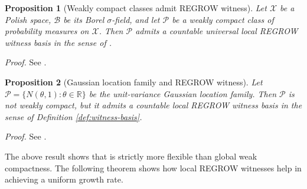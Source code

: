 \documentclass[12pt]{article}
\theoremstyle{spaced}
\newtheorem{proposition}[proposition]{Proposition}
\theoremstyle{remark}
\begin{document}
\begin{proposition}[Weakly compact classes admit REGROW witness]
\label{lem:compact-witness-basis}
Let $\mathcal{X}$ be a Polish space, $ \mathcal{B}$ be its Borel $\sigma$-field, and let $\mathcal{P}$ be a weakly compact class of probability measures on $\mathcal{X}$. Then $\mathcal P$ admits a countable
universal local REGROW witness basis in the sense of
.
\end{proposition}
\emph{Proof.} See .


\begin{proposition}[Gaussian location family and REGROW witness]
\label{prop:gaussian-local-witness}
Let $\mathcal{P} = \{N(\theta, 1) : \theta \in \mathbb{R}\}$ be the unit-variance Gaussian location family. Then $\mathcal{P}$ is not weakly compact, but it admits a countable local REGROW witness basis in the sense of Definition \ref{def:witness-basis}.
\end{proposition}

\emph{Proof.} See .

The above result shows that  is strictly more flexible
than global weak compactness.
The following theorem shows how local REGROW witnesses help in achieving a uniform growth rate.
\end{document}
